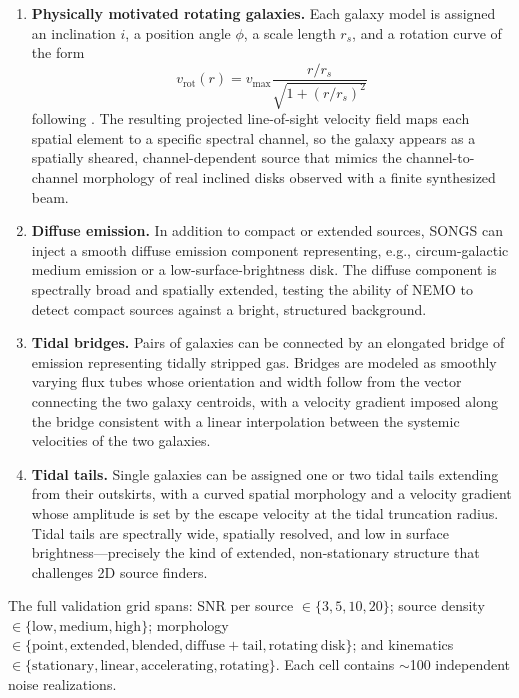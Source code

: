 \documentclass{aa}
\begin{document}
\begin{enumerate}
  \item \textbf{Physically motivated rotating galaxies.} Each galaxy model is assigned an inclination $i$, a position angle $\phi$, a scale length $r_s$, and a rotation curve of the form
  \begin{equation}
    v_\mathrm{rot}(r) = v_\mathrm{max} \frac{r / r_s}{\sqrt{1 + (r/r_s)^2}}
  \end{equation}
  following \citet{Freeman1970}. The resulting projected line-of-sight velocity field maps each spatial element to a specific spectral channel, so the galaxy appears as a spatially sheared, channel-dependent source that mimics the channel-to-channel morphology of real inclined disks observed with a finite synthesized beam.

  \item \textbf{Diffuse emission.} In addition to compact or extended sources, SONGS can inject a smooth diffuse emission component representing, e.g., circum-galactic medium emission or a low-surface-brightness disk. The diffuse component is spectrally broad and spatially extended, testing the ability of NEMO to detect compact sources against a bright, structured background.

  \item \textbf{Tidal bridges.} Pairs of galaxies can be connected by an elongated bridge of emission representing tidally stripped gas. Bridges are modeled as smoothly varying flux tubes whose orientation and width follow from the vector connecting the two galaxy centroids, with a velocity gradient imposed along the bridge consistent with a linear interpolation between the systemic velocities of the two galaxies.

  \item \textbf{Tidal tails.} Single galaxies can be assigned one or two tidal tails extending from their outskirts, with a curved spatial morphology and a velocity gradient whose amplitude is set by the escape velocity at the tidal truncation radius. Tidal tails are spectrally wide, spatially resolved, and low in surface brightness---precisely the kind of extended, non-stationary structure that challenges 2D source finders.
\end{enumerate}

The full validation grid spans: SNR per source $\in \{3, 5, 10, 20\}$; source density $\in \{\mathrm{low, medium, high}\}$; morphology $\in \{\mathrm{point, extended, blended, diffuse+tail, rotating~disk}\}$; and kinematics $\in \{\mathrm{stationary, linear, accelerating, rotating}\}$. Each cell contains $\sim$100 independent noise realizations.
\end{document}
